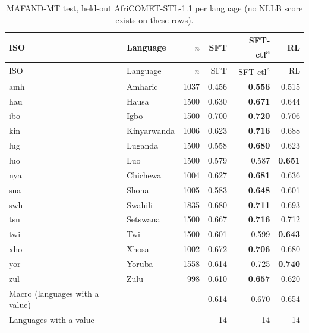 {\footnotesize\setlength{\tabcolsep}{3pt}
\begin{longtable}{@{}llrrrr@{}}
\caption{MAFAND-MT test, held-out AfriCOMET-STL-1.1 per language (no NLLB score exists on these rows).}\label{tab:full-mafand-comet}\\
\toprule
ISO & Language & $n$ & SFT & SFT-ctl\textsuperscript{a} & RL \\
\midrule\endfirsthead
\toprule
ISO & Language & $n$ & SFT & SFT-ctl\textsuperscript{a} & RL \\
\midrule\endhead
\midrule\endfoot
\bottomrule\endlastfoot
amh & Amharic & 1037 & 0.456 & \textbf{0.556} & 0.515 \\
hau & Hausa & 1500 & 0.630 & \textbf{0.671} & 0.644 \\
ibo & Igbo & 1500 & 0.700 & \textbf{0.720} & 0.706 \\
kin & Kinyarwanda & 1006 & 0.623 & \textbf{0.716} & 0.688 \\
lug & Luganda & 1500 & 0.558 & \textbf{0.680} & 0.623 \\
luo & Luo & 1500 & 0.579 & 0.587 & \textbf{0.651} \\
nya & Chichewa & 1004 & 0.627 & \textbf{0.681} & 0.636 \\
sna & Shona & 1005 & 0.583 & \textbf{0.648} & 0.601 \\
swh & Swahili & 1835 & 0.680 & \textbf{0.711} & 0.693 \\
tsn & Setswana & 1500 & 0.667 & \textbf{0.716} & 0.712 \\
twi & Twi & 1500 & 0.601 & 0.599 & \textbf{0.643} \\
xho & Xhosa & 1002 & 0.672 & \textbf{0.706} & 0.680 \\
yor & Yoruba & 1558 & 0.614 & 0.725 & \textbf{0.740} \\
zul & Zulu & 998 & 0.610 & \textbf{0.657} & 0.620 \\
\midrule
Macro (languages with a value) & & & 0.614 & 0.670 & 0.654 \\
Languages with a value & & & 14 & 14 & 14 \\
\end{longtable}}

